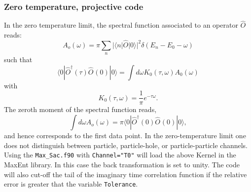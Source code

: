\subsubsection{Zero temperature, projective code}

 In the zero temperature limit,  the spectral function associated to an operator $\hat{O} $    reads:
 \begin{equation}
 	  A_o(\omega)    = \pi  \sum_{n}    | \langle n  | \hat{O} | 0 \rangle |^2 \delta( E_n - E_0 - \omega) 
 \end{equation}
 such that 
 \begin{equation}
 	\langle 0 | \hat{O}^{\dagger}(\tau) \hat{O}^{}(0) | 0 \rangle =  \int d  \omega  K_0(\tau,\omega) A_0(\omega) 
 \end{equation}
 with 
 \begin{equation}
 	K_0(\tau,\omega)  = \frac{1}{\pi}e^{-\tau \omega}.
 \end{equation}
 The zeroth moment of the spectral function reads, 
 \begin{equation}
  \int d \omega A_o(\omega) = \pi \langle 0 | \hat{O}^{\dagger}(0) \hat{O}^{}(0) | 0 \rangle, 
 \end{equation}
 and hence corresponds to the first data point. 
 In the zero-temperature limit one does not distinguish between  particle, particle-hole, or particle-particle channels.
 Using the \texttt{Max\_Sac.f90}  with \texttt{Channel="T0"}   will  load the above Kernel in the MaxEnt library. In this case the back  transformation is set to unity. 
 The code will also cut-off the tail of the  imaginary time correlation function  if the relative error is greater that the variable \texttt{Tolerance}. 
